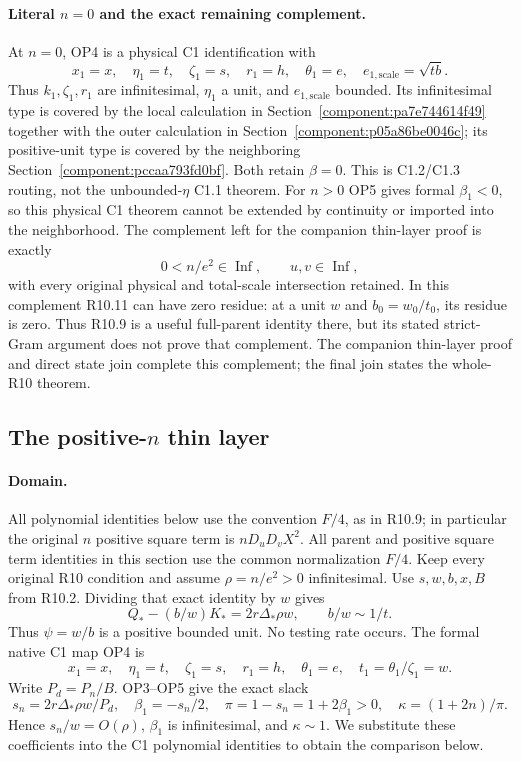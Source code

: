 \paragraph{Literal $n=0$ and the exact remaining complement.}
At $n=0$, OP4 is a physical C1 identification with
\[
 x_1=x,\quad\eta_1=t,\quad\zeta_1=s,\quad r_1=h,
 \quad\theta_1=e,\quad e_{1,\mathrm{scale}}=\sqrt{tb}.
\]
Thus $k_1,\zeta_1,r_1$ are infinitesimal, $\eta_1$ a unit, and
$e_{1,\mathrm{scale}}$ bounded. Its infinitesimal type is covered by
the local calculation in Section~\ref{component:pa7e744614f49} together with the outer calculation in Section~\ref{component:p05a86be0046c};
its positive-unit type is covered by the neighboring
Section~\ref{component:pccaa793fd0bf}. Both retain $\beta=0$.
This is C1.2/C1.3 routing, not the unbounded-$\eta$ C1.1 theorem.
For $n>0$ OP5 gives formal $\beta_1<0$, so this physical C1 theorem
cannot be extended by continuity or imported into the neighborhood.
The complement left for the companion thin-layer proof is exactly
\[
       0<n/e^2\in\operatorname{Inf},\qquad u,v\in\operatorname{Inf},
\]
with every original physical and total-scale intersection retained.
In this complement R10.11 can have zero residue: at a unit $w$ and
$b_0=w_0/t_0$, its residue is zero. Thus R10.9 is a useful full-parent
identity there, but its stated strict-Gram argument does not prove that
complement. The companion thin-layer proof and direct state join complete this complement; the final join states the whole-R10 theorem.

\subsection{The positive-$n$ thin layer}
\label{component:pef37475d831e}

\paragraph{Domain.}
All polynomial identities below use the convention $F/4$, as in
R10.9; in particular the original $n$ positive square term is $nD_uD_vX^2$.
All parent and positive square term identities in this section use the common normalization $F/4$.
Keep every original R10 condition and assume
$\rho=n/e^2>0$ infinitesimal. Use $s,w,b,x,B$ from R10.2.
Dividing that exact identity by $w$ gives
\[
 Q_*-(b/w)K_*=2r\Delta_*\rho w,
 \qquad b/w\sim1/t.
\tag{TL1}
\]
Thus $\psi=w/b$ is a positive bounded unit. No testing rate occurs.
The formal native C1 map OP4 is
\[
 x_1=x,\quad\eta_1=t,\quad\zeta_1=s,\quad r_1=h,\quad
 \theta_1=e,\quad t_1=\theta_1/\zeta_1=w.
\]
Write $P_d=P_n/B$. OP3--OP5 give the exact slack
\[
 s_n=2r\Delta_*\rho w/P_d,\quad
 \beta_1=-s_n/2,\quad \pi=1-s_n=1+2\beta_1>0,\quad
 \kappa=(1+2n)/\pi.
\tag{TL2}
\]
Hence $s_n/w=O(\rho)$, $\beta_1$ is infinitesimal, and
$\kappa\sim1$. We substitute these coefficients into the C1 polynomial identities to obtain the comparison below.

